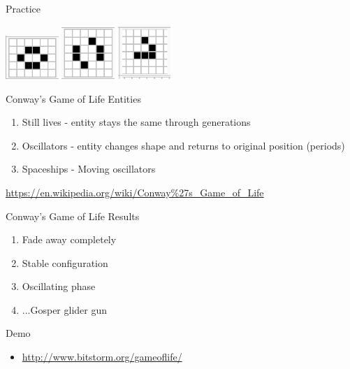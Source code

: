 \documentclass[bigger]{beamer}
\begin{document}
\begin{frame}[label=sec-17]{Practice}
\begin{center}
\includegraphics[width=2cm]{images/beehive.png}
\includegraphics[width=2cm]{images/toad.png}
\includegraphics[width=2cm]{images/glider.png}
\end{center}
\end{frame}
\begin{frame}[label=sec-18]{Conway's Game of Life Entities}
\begin{enumerate}
\item<1->Still lives - entity stays the same through generations
\item<2->Oscillators - entity changes shape and returns to original position (periods)
\item<3->Spaceships - Moving oscillators
\end{enumerate}
\url{https://en.wikipedia.org/wiki/Conway\%27s_Game_of_Life}
\end{frame}
\begin{frame}[label=sec-19]{Conway's Game of Life Results}
\begin{enumerate}
\item<1->Fade away completely
\item<2->Stable configuration
\item<3->Oscillating phase
\item<4->...Gosper glider gun
\end{enumerate}
\end{frame}
\begin{frame}[label=sec-20]{Demo}
\begin{itemize}
\item \url{http://www.bitstorm.org/gameoflife/}
\end{itemize}
\end{frame}
\end{document}

